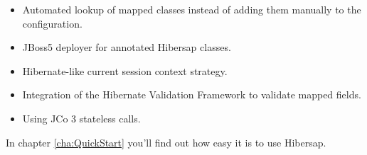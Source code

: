 \begin{itemize}
  \item Automated lookup of mapped classes instead of adding them manually to the configuration.
  \item JBoss5 deployer for annotated Hibersap classes.
  \item Hibernate-like current session context strategy.
  \item Integration of the Hibernate Validation Framework to validate mapped fields.  
  \item Using JCo 3 stateless calls.
\end{itemize}

In chapter \ref{cha:QuickStart} you'll find out how easy it is to use Hibersap.

